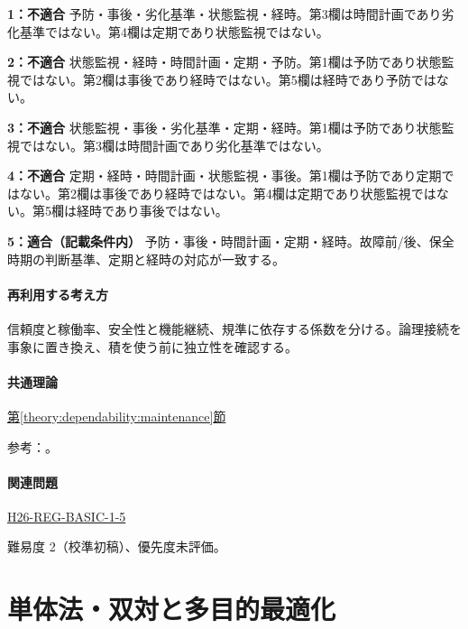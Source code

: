 \noindent\textbf{1：不適合} 予防・事後・劣化基準・状態監視・経時。第3欄は時間計画であり劣化基準ではない。第4欄は定期であり状態監視ではない。\par

\noindent\textbf{2：不適合} 状態監視・経時・時間計画・定期・予防。第1欄は予防であり状態監視ではない。第2欄は事後であり経時ではない。第5欄は経時であり予防ではない。\par

\noindent\textbf{3：不適合} 状態監視・事後・劣化基準・定期・経時。第1欄は予防であり状態監視ではない。第3欄は時間計画であり劣化基準ではない。\par

\noindent\textbf{4：不適合} 定期・経時・時間計画・状態監視・事後。第1欄は予防であり定期ではない。第2欄は事後であり経時ではない。第4欄は定期であり状態監視ではない。第5欄は経時であり事後ではない。\par

\noindent\textbf{5：適合（記載条件内）} 予防・事後・時間計画・定期・経時。故障前/後、保全時期の判断基準、定期と経時の対応が一致する。\par

\paragraph{再利用する考え方} 信頼度と稼働率、安全性と機能継続、規準に依存する係数を分ける。論理接続を事象に置き換え、積を使う前に独立性を確認する。

\paragraph{共通理論} \hyperref[theory:dependability:maintenance]{第\ref*{theory:dependability:maintenance}節}

\par 参考：\cite{maintenance_mlit_2013}。

\paragraph{関連問題} \hyperref[q:h26-reg-basic-1-5]{H26-REG-BASIC-1-5}

\par 難易度 2（校準初稿）、優先度未評価。

\section{単体法・双対と多目的最適化}

